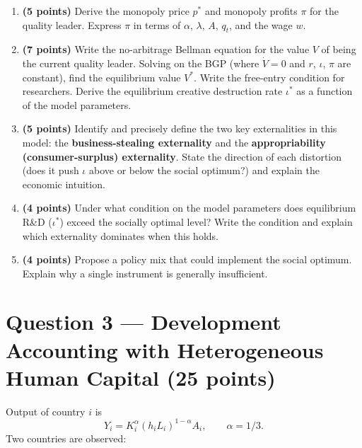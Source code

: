 \documentclass[a4paper,11pt]{article}
\begin{document}
\begin{enumerate}[label=\textbf{\arabic*.}, leftmargin=*, itemsep=10pt]

    \item \textbf{(5 points)} Derive the monopoly price $p^*$ and monopoly profits $\pi$
    for the quality leader. Express $\pi$ in terms of $\alpha$, $\lambda$, $A$, $q_t$, and
    the wage $w$.

    \item \textbf{(7 points)} Write the no-arbitrage Bellman equation for the value $V$ of
    being the current quality leader. Solving on the BGP (where $\dot{V}=0$ and $r$, $\iota$,
    $\pi$ are constant), find the equilibrium value $V^*$. Write the free-entry condition
    for researchers. Derive the equilibrium creative destruction rate $\iota^*$ as a function
    of the model parameters.

    \item \textbf{(5 points)} Identify and precisely define the two key externalities in
    this model: the \textbf{business-stealing externality} and the
    \textbf{appropriability (consumer-surplus) externality}. State the direction of each
    distortion (does it push $\iota$ above or below the social optimum?) and explain the
    economic intuition.

    \item \textbf{(4 points)} Under what condition on the model parameters does equilibrium
    R\&D ($\iota^*$) exceed the socially optimal level? Write the condition and explain
    which externality dominates when this holds.

    \item \textbf{(4 points)} Propose a policy mix that could implement the social optimum.
    Explain why a single instrument is generally insufficient.

\end{enumerate}

\clearpage

\section{Question 3 --- Development Accounting with Heterogeneous Human Capital
\hfill (25 points)}

Output of country $i$ is
\[
    Y_i = K_i^{\alpha}(h_i L_i)^{1-\alpha} A_i, \qquad \alpha = 1/3.
\]
Two countries are observed:
\end{document}
